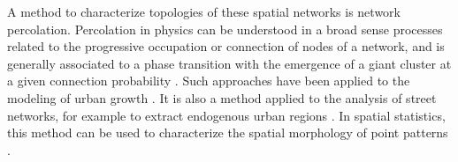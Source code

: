 \documentclass{jimis-en}
\begin{document}
\cite{lagesse2015spatial} %





A method to characterize topologies of these spatial networks is network percolation. Percolation in physics can be understood in a broad sense processes related to the progressive occupation or connection of nodes of a network, and is generally associated to a phase transition with the emergence of a giant cluster at a given connection probability \citep{callaway2000network}. Such approaches have been applied to the modeling of urban growth \citep{makse1998modeling}. It is also a method applied to the analysis of street networks, for example to extract endogenous urban regions \citep{arcaute2016cities}. In spatial statistics, this method can be used to characterize the spatial morphology of point patterns \cite{huynh2018characterisation}.


\cite{piovani2017urban} %



\cite{cottineau2018defining}

% 
\end{document}
